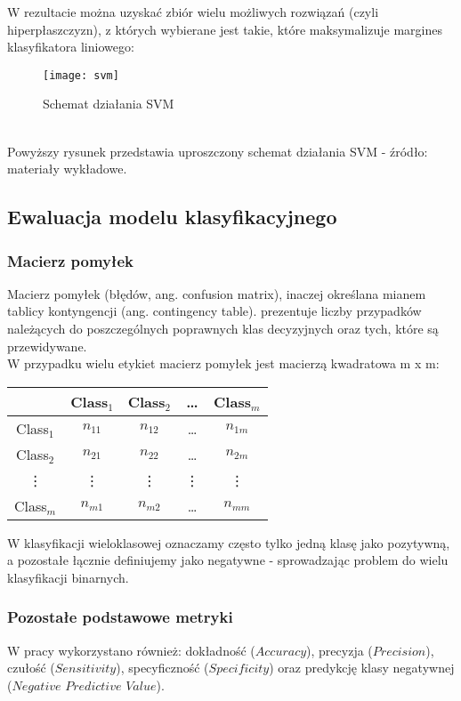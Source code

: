 W rezultacie można uzyskać zbiór wielu możliwych rozwiązań (czyli hiperpłaszczyzn), z których wybierane jest takie, które maksymalizuje margines klasyfikatora liniowego:\\
\begin{figure}[h]
    \centering
    \texttt{[image: svm]}
    \caption{Schemat działania SVM}
    \label{fig:svm}
\end{figure}\\
Powyższy rysunek przedstawia uproszczony schemat działania SVM - źródło: materiały wykładowe.

\subsection{Ewaluacja modelu klasyfikacyjnego}
\subsubsection{Macierz pomyłek \cite{wyklad}}
Macierz pomyłek (błędów, ang. confusion matrix), inaczej określana mianem tablicy kontyngencji (ang. contingency table). prezentuje liczby przypadków należących do poszczególnych poprawnych klas decyzyjnych oraz tych, które są przewidywane.\\

W przypadku wielu etykiet macierz pomyłek jest macierzą kwadratowa m x m:\\


\begin{table}[h!]
    \centering
    \begin{tabular}{|c|c|c|c|c|}
    \hline
     & Class$_1$ & Class$_2$ & \ldots & Class$_m$ \\
    \hline
    Class$_1$ & $n_{11}$ & $n_{12}$ & \ldots & $n_{1m}$ \\
    \hline
    Class$_2$ & $n_{21}$ & $n_{22}$ & \ldots & $n_{2m}$ \\
    \hline
    \vdots & \vdots & \vdots & \vdots & \vdots \\
    \hline
    Class$_m$ & $n_{m1}$ & $n_{m2}$ & \ldots & $n_{mm}$ \\
    \hline
    \end{tabular}
    \end{table}
    
\noindent W klasyfikacji wieloklasowej oznaczamy często tylko jedną klasę jako pozytywną, a pozostałe łącznie definiujemy jako negatywne - sprowadzając problem do wielu klasyfikacji binarnych.

\subsubsection{Pozostałe podstawowe metryki}
W pracy wykorzystano również: dokładność ($Accuracy$), precyzja ($Precision$), czułość ($Sensitivity$), specyficzność ($Specificity$) oraz predykcję klasy negatywnej ($Negative$ $Predictive$ $Value$). 